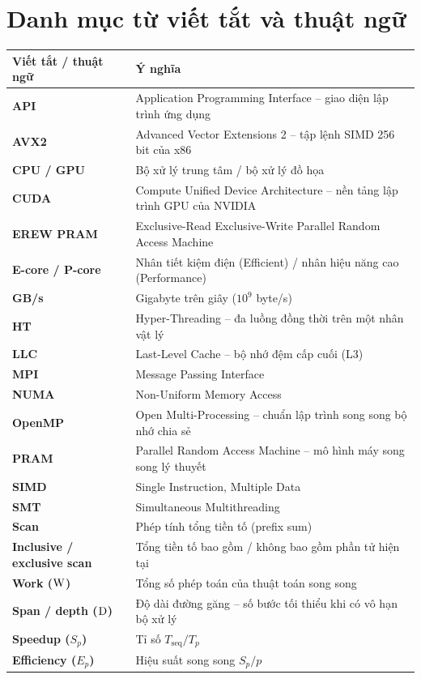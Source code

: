 \chapter*{Danh mục từ viết tắt và thuật ngữ}

\begin{table}[H]
\centering
\renewcommand{\arraystretch}{1.25}
\begin{tabularx}{\textwidth}{>{\bfseries}p{3.2cm}X}
\toprule
\textnormal{\textbf{Viết tắt / thuật ngữ}} & \textbf{Ý nghĩa} \\
\midrule
API & Application Programming Interface -- giao diện lập trình ứng dụng \\
AVX2 & Advanced Vector Extensions 2 -- tập lệnh SIMD 256 bit của x86 \\
CPU / GPU & Bộ xử lý trung tâm / bộ xử lý đồ họa \\
CUDA & Compute Unified Device Architecture -- nền tảng lập trình GPU của NVIDIA \\
EREW PRAM & Exclusive-Read Exclusive-Write Parallel Random Access Machine \\
E-core / P-core & Nhân tiết kiệm điện (Efficient) / nhân hiệu năng cao (Performance) \\
GB/s & Gigabyte trên giây (\(10^9\) byte/s) \\
HT & Hyper-Threading -- đa luồng đồng thời trên một nhân vật lý \\
LLC & Last-Level Cache -- bộ nhớ đệm cấp cuối (L3) \\
MPI & Message Passing Interface \\
NUMA & Non-Uniform Memory Access \\
OpenMP & Open Multi-Processing -- chuẩn lập trình song song bộ nhớ chia sẻ \\
PRAM & Parallel Random Access Machine -- mô hình máy song song lý thuyết \\
SIMD & Single Instruction, Multiple Data \\
SMT & Simultaneous Multithreading \\
Scan & Phép tính tổng tiền tố (prefix sum) \\
Inclusive / exclusive scan & Tổng tiền tố bao gồm / không bao gồm phần tử hiện tại \\
Work (\(\mathrm{W}\)) & Tổng số phép toán của thuật toán song song \\
Span / depth (\(\mathrm{D}\)) & Độ dài đường găng -- số bước tối thiểu khi có vô hạn bộ xử lý \\
Speedup (\(S_p\)) & Tỉ số \(T_{\text{seq}}/T_p\) \\
Efficiency (\(E_p\)) & Hiệu suất song song \(S_p/p\) \\
\bottomrule
\end{tabularx}
\end{table}
